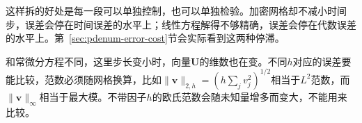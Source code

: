 这样拆的好处是每一段可以单独控制，也可以单独检验。加密网格却不减小时间步，误差会停在时间误差的水平上；线性方程解得不够精确，误差会停在代数误差的水平上。第~\ref{sec:pdenum-error-cost}节会实际看到这两种停滞。

和常微分方程不同，这里步长变小时，向量$\bm{U}$的维数也在变。不同$h$对应的误差要能比较，范数必须随网格换算，比如$\lVert\bm{v}\rVert_{2,h}=(h\sum_jv_j^2)^{1/2}$相当于$L^2$范数，而$\lVert\bm{v}\rVert_\infty$相当于最大模。不带因子$h$的欧氏范数会随未知量增多而变大，不能用来比较。
